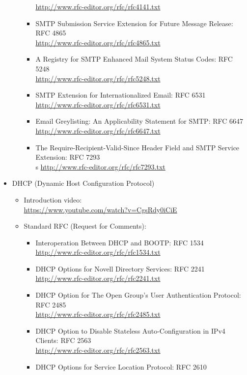 \begin{itemize}
\begin{itemize}
\begin{itemize}
\url{http://www.rfc-editor.org/rfc/rfc4141.txt}
\item SMTP Submission Service Extension for Future Message Release: RFC 4865\\
\url{http://www.rfc-editor.org/rfc/rfc4865.txt}
\item A Registry for SMTP Enhanced Mail System Status Codes: RFC 5248\\
\url{http://www.rfc-editor.org/rfc/rfc5248.txt}
\item SMTP Extension for Internationalized Email: RFC 6531\\
\url{http://www.rfc-editor.org/rfc/rfc6531.txt}
\item Email Greylisting: An Applicability Statement for SMTP: RFC 6647\\
\url{http://www.rfc-editor.org/rfc/rfc6647.txt}
\item The Require-Recipient-Valid-Since Header Field and SMTP Service 
Extension: RFC 7293\\s
\url{http://www.rfc-editor.org/rfc/rfc7293.txt}
\end{itemize}
\end{itemize}
\item DHCP (Dynamic Host Configuration Protocol)\\ 
\begin{itemize}
\item Introduction video:\\
\url{https://www.youtube.com/watch?v=CgsRdy0iCiE}
\item Standard RFC (Request for Comments): \\
\begin{itemize}
\item Interoperation Between DHCP and BOOTP: RFC 1534\\
\url{http://www.rfc-editor.org/rfc/rfc1534.txt}
\item DHCP Options for Novell Directory Services: RFC 2241\\
\url{http://www.rfc-editor.org/rfc/rfc2241.txt}
\item DHCP Option for The Open Group's User Authentication Protocol: 
RFC 2485\\
\url{http://www.rfc-editor.org/rfc/rfc2485.txt}
\item DHCP Option to Disable Stateless Auto-Configuration in IPv4 
Clients: RFC 2563\\
\url{http://www.rfc-editor.org/rfc/rfc2563.txt}
\item DHCP Options for Service Location Protocol: RFC 2610\\

\end{itemize}
\end{itemize}
\end{itemize}
